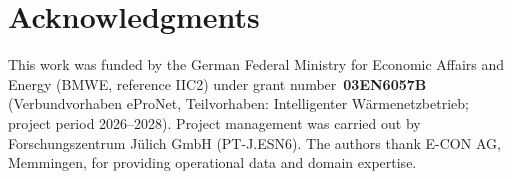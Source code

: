 \documentclass[review,3p]{elsarticle}
\begin{document}
\section*{Acknowledgments}
This work was funded by the German Federal Ministry for Economic Affairs and
Energy (BMWE, reference IIC2) under grant number~\textbf{03EN6057B}
(Verbundvorhaben eProNet, Teilvorhaben: Intelligenter Wärmenetzbetrieb;
project period 2026--2028).
Project management was carried out by Forschungszentrum Jülich GmbH
(PT-J.ESN6).
The authors thank E-CON AG, Memmingen, for providing operational data and
domain expertise.


\end{document}
